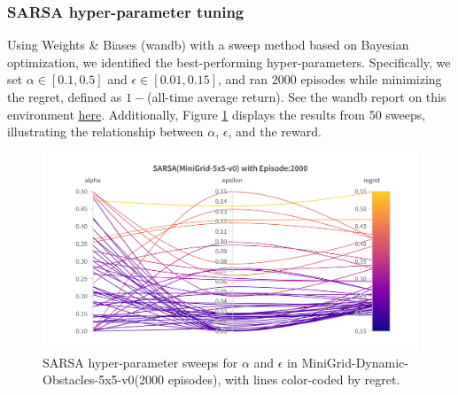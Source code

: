 \documentclass[11pt, a4]{article}
\begin{document}
			\subsubsection{SARSA hyper-parameter tuning}
			Using Weights \& Biases (wandb) with a sweep method based on Bayesian optimization, we identified the best-performing hyper-parameters. Specifically, we set $\alpha \in [0.1, 0.5]$ and $\epsilon \in [0.01, 0.15]$, and ran 2000 episodes while minimizing the regret, defined as \(1 -\)(all-time average return). See the wandb report on this environment \href{https://api.wandb.ai/links/ee24e009-iitm/axvqh3jk}{here}. Additionally, Figure \ref{fig:sarsaminigridworld-regret} displays the results from 50 sweeps, illustrating the relationship between $\alpha$, $\epsilon$, and the reward.
			\begin{figure}[H]
				\centering
				\includegraphics[width=1\linewidth]{sarsa-hyp-tuning-minigridworld.png}
				\caption{SARSA hyper-parameter sweeps for $\alpha$ and $\epsilon$ in MiniGrid-Dynamic-Obstacles-5x5-v0(2000 episodes), with lines color-coded by regret.}
				\label{fig:sarsaminigridworld-regret}
			\end{figure}
\end{document}
